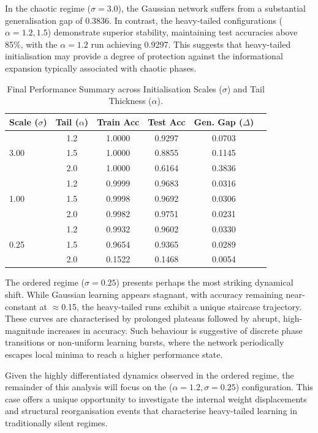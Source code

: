 \documentclass[11pt,a4paper]{article}
\begin{document}
In the chaotic regime ($\sigma=3.0$), the Gaussian network suffers from a substantial generalisation gap of 0.3836. In contrast, the heavy-tailed configurations ($\alpha=1.2,1.5$) demonstrate superior stability, maintaining test accuracies above 85\%, with the $\alpha=1.2$ run achieving 0.9297. This suggests that heavy-tailed initialisation may provide a degree of protection against the informational expansion typically associated with chaotic phases.

\begin{table}[htbp]
\centering
\caption{Final Performance Summary across Initialisation Scales ($\sigma$) and Tail Thickness ($\alpha$).}
\label{tab:performance_summary}
\begin{tabular}{lccccr}
\toprule
\textbf{Scale ($\sigma$)} & \textbf{Tail ($\alpha$)} & \textbf{Train Acc} & \textbf{Test Acc} & \textbf{Gen. Gap ($\Delta$)} \\ \midrule
\multirow{3}{*}{3.00} & 1.2 & 1.0000 & 0.9297 & 0.0703 \\
                      & 1.5 & 1.0000 & 0.8855 & 0.1145\\
                      & 2.0 & 1.0000 & 0.6164 & 0.3836\\ \hline
\multirow{3}{*}{1.00} & 1.2 & 0.9999 & 0.9683 & 0.0316 \\
                      & 1.5 & 0.9998 & 0.9692 & 0.0306 \\
                      & 2.0 & 0.9982 & 0.9751 & 0.0231 \\ \hline
\multirow{3}{*}{0.25} & 1.2 & 0.9932 & 0.9602 & 0.0330 \\
                      & 1.5 & 0.9654 & 0.9365 & 0.0289 \\
                      & 2.0 & 0.1522 & 0.1468 & 0.0054 \\ \bottomrule
\end{tabular}
\end{table}

The ordered regime ($\sigma=0.25$) presents perhaps the most striking dynamical shift. While Gaussian learning appears stagnant, with accuracy remaining near-constant at $\approx$0.15, the heavy-tailed runs exhibit a unique staircase trajectory. These curves are characterised by prolonged plateaus followed by abrupt, high-magnitude increases in accuracy. Such behaviour is suggestive of discrete phase transitions or non-uniform learning bursts, where the network periodically escapes local minima to reach a higher performance state.

Given the highly differentiated dynamics observed in the ordered regime, the remainder of this analysis will focus on the ($\alpha=1.2,\sigma=0.25$) configuration. This case offers a unique opportunity to investigate the internal weight displacements and structural reorganisation events that characterise heavy-tailed learning in traditionally silent regimes.
\end{document}
